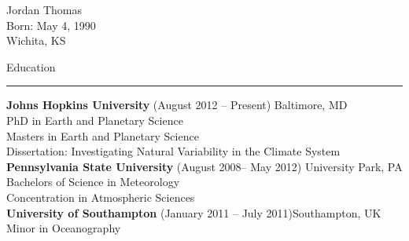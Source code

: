 \begin{cv}
  \begin{centering}
    \Huge{Jordan Thomas}\\
    \normalsize{Born: May 4, 1990}\\
    \normalsize{Wichita, KS}\\
  \end{centering}
  \vspace{1cm}
  \noindent\Large{Education}\\
  \vspace{0.2cm}
  \noindent\rule{\textwidth}{0.4pt}
  \normalsize{
  \noindent \textbf{Johns Hopkins University} (August 2012 -- Present) \hfill Baltimore, MD\\
	\indent PhD in Earth and Planetary Science\\
	\indent Masters in Earth and Planetary Science\\
	\indent Dissertation: Investigating Natural Variability in the Climate System\\
  \noindent \textbf{Pennsylvania State University} (August 2008-- May 2012) \hfill University Park, PA\\
	\indent Bachelors of Science in Meteorology\\
	\indent Concentration in Atmospheric Sciences \\
  \noindent \textbf{University of Southampton} (January 2011 -- July 2011)\hfill Southampton, UK\\
	\indent Minor in Oceanography\\
  }


\end{cv}
